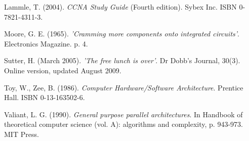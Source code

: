\documentclass[a4paper, 12pt]{article}
\begin{document}
\begin{thebibliography}{30}
 Lammle, T. (2004). \textit{CCNA Study Guide} (Fourth edition). Sybex Inc. ISBN 0-7821-4311-3.

 Moore, G. E. (1965). \textit{'Cramming more components onto integrated circuits'}. Electronics Magazine. p. 4.

 Sutter, H. (March 2005). \textit{'The free lunch is over'}. Dr Dobb's Journal, 30(3). Online version, updated August 2009.

 Toy, W., Zee, B. (1986). \textit{Computer Hardware/Software Architecture}. Prentice Hall. ISBN 0-13-163502-6.

 Valiant, L. G. (1990). \textit{General purpose parallel architectures}. In Handbook of theoretical computer science (vol. A): algorithms and complexity, p. 943-973. MIT Press.

\end{thebibliography}
\end{document}

